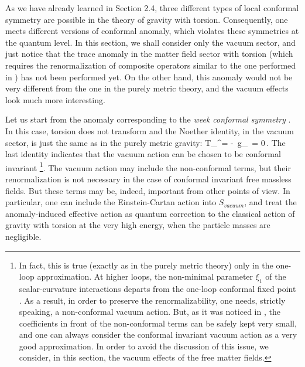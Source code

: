 As we have already learned in Section 2.4, three different 
types of local conformal symmetry are possible in the theory
of gravity with torsion. Consequently, one  
meets different versions of conformal anomaly, which 
violates these symmetries at the quantum level. In this 
section, we
shall consider only the vacuum sector, and just notice 
that the trace anomaly in the matter field sector with 
torsion (which requires the renormalization
of composite operators similar to the one performed in 
\cite{brawn-collins}) has not been performed yet. On the
other hand, this anomaly would not be very different 
from the one in the purely metric theory, and
the vacuum effects look much more interesting. 

Let us start from the anomaly corresponding to the 
{\it week conformal symmetry} \cite{buodsh}. In this 
case, torsion does not transform and the Noether identity, 
in the vacuum sector, is just 
the same as in the purely metric gravity:
\beq
T_\mu^\mu = - \,g_{\mu\nu}\,
 = 0\,.
\label{trace-class-weak}
\eeq
The last identity indicates that the vacuum action can be 
chosen to be conformal invariant 
\footnote{In fact, this is true (exactly as in the 
purely metric theory) only in the one-loop approximation. 
At higher loops, the non-minimal parameter $\xi_1$ of the 
scalar-curvature interactions departs from the one-loop
conformal fixed point \cite{brv}. As a result, in order to 
preserve the renormalizability, one needs, strictly speaking, 
a non-conformal vacuum action. But, as it was noticed 
in \cite{brv}, the coefficients in front of the non-conformal
terms can be safely kept very small, and one can always
consider the conformal invariant vacuum action as a very 
good approximation. In order to avoid the discussion 
of this issue, we consider, in this section, the vacuum 
effects of the free matter fields.}. 
The vacuum action may include the non-conformal 
terms, but their renormalization is
not necessary in the case of conformal invariant free
massless fields. But these terms may be,
indeed, important from other points of view. 
In particular, one can include the Einstein-Cartan action
into $S_{vacuum}$, and treat the anomaly-induced 
effective action as quantum correction to the classical 
action of gravity with torsion at the very high energy, when 
the particle masses are negligible. 

